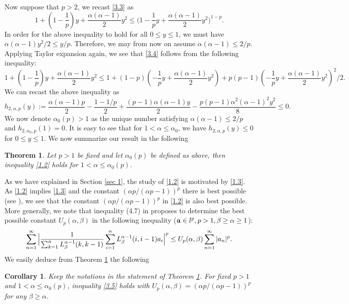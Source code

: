 \documentclass[11pt]{amsart}
\newtheorem{theorem}{Theorem}[section]
\newtheorem{cor}{Corollary}[section]
\numberwithin{equation}{section}
\theoremstyle{definition}
\theoremstyle{remark}
\begin{document}
   Now suppose that $p>2$, we recast \eqref{3.3} as
\begin{equation}
\label{3.4}
   1+(1-\frac {1}{p})y+\frac {\alpha(\alpha-1)}{2}y^2
  \leq \Big(1-\frac {1}{p}y+\frac {\alpha(\alpha-1)}{2}y^2
\Big )^{1-p}.
\end{equation}
    In order for the above inequality to hold for all $0 \leq y
    \leq 1$, we must have $\alpha(\alpha-1)y^2/2 \leq y/p$.
    Therefore, we may from now on assume $\alpha(\alpha-1) \leq
    2/p$. Applying Taylor expansion again, we see that \eqref{3.4}
    follows from the following inequality:
\begin{equation*}
   1+(1-\frac {1}{p})y+\frac {\alpha(\alpha-1)}{2}y^2
  \leq 1+(1-p)(-\frac {1}{p}y+\frac {\alpha(\alpha-1)}{2}y^2)+p(p-1)(-\frac {1}{p}y+\frac {\alpha(\alpha-1)}{2}y^2)^2/2.
\end{equation*}
   We can recast the above inequality as
\begin{equation*}
   h_{2,\alpha, p}(y):=\frac {\alpha(\alpha-1)p}{2}-\frac {1-1/p}{2}+\frac {(p-1)\alpha(\alpha-1)y}{2}-\frac {p(p-1)\alpha^2(\alpha-1)^2y^2}{8} \leq 0.
\end{equation*}
   We now denote $\alpha_0(p)>1$ as the unique number satisfying $\alpha(\alpha-1)
   \leq 2/p$ and
   $h_{2, \alpha_0,p}(1)=0$. It is easy to see that for $1<\alpha \leq \alpha_0$, we have $h_{2, \alpha,
   p}(y)\leq 0$ for $0 \leq y \leq 1$. We now summarize our result
   in the following
\begin{theorem}
\label{thm3.2}
   Let $p>1$ be fixed and let $\alpha_0(p)$ be defined as above, then inequality \eqref{1.2} holds for $1<\alpha
   \leq \alpha_0(p)$.
\end{theorem}

   As we have explained in Section \ref{sec 1}, the study of \eqref{1.2} is motivated by \eqref{1.3}.
   As \eqref{1.2} implies \eqref{1.3} and the constant $(\alpha p/(\alpha p-1))^p$ there is best possible (see
   \cite{G8}), we see that the constant $(\alpha p/(\alpha p-1))^p$ in
\eqref{1.2} is also best possible. More generally, we note that
inequality
   (4.7) in \cite{G8} proposes to determine the best possible constant $U_p(\alpha, \beta)$
   in the following inequality (${\bf a} \in l^p, p>1, \beta
\geq \alpha \geq 1$):
\begin{equation}
\label{3.5}
 \sum^{\infty}_{n=1}\Big{|}\frac
1{\sum^n_{k=1}L^{\alpha-1}_{\beta}(k,
k-1)}\sum^n_{i=1}L^{\alpha-1}_{\beta}(i, i-1)a_i \Big{|}^p \leq
U_p(\alpha, \beta)\sum^{\infty}_{n=1}|a_n|^p.
\end{equation}
    We easily
    deduce from Theorem \ref{thm3.2} the following
\begin{cor}
   Keep the notations in the statement of Theorem \ref{thm3.2}.
   For fixed $p>1$ and $1<\alpha \leq \alpha_0(p)$,
   inequality \eqref{3.5} holds with $U_p(\alpha, \beta)=(\alpha p/(\alpha p-1))^p$ for any $\beta \geq
   \alpha$.
\end{cor}
\end{document}
